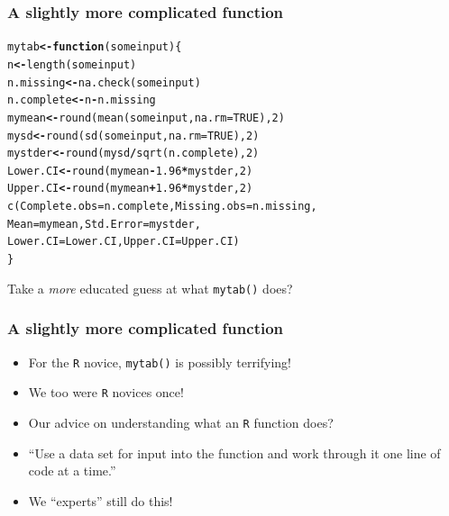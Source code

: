 \documentclass{beamer}\usepackage[]{graphicx}\usepackage[]{color}
\makeatletter
\newcommand{\hlnum}[1]{\textcolor[rgb]{0.533,0,0.133}{#1}}%
\newcommand{\hlopt}[1]{\textcolor[rgb]{0,0,0}{\textbf{#1}}}%
\newcommand{\hlstd}[1]{\textcolor[rgb]{0,0,0}{#1}}%
\newcommand{\hlkwa}[1]{\textcolor[rgb]{0.4,0.067,0.067}{\textbf{#1}}}%
\newcommand{\hlkwb}[1]{\textcolor[rgb]{0,0,0.4}{\textbf{#1}}}%
\newcommand{\hlkwc}[1]{\textcolor[rgb]{0,0,0.4}{#1}}%
\newcommand{\hlkwd}[1]{\textcolor[rgb]{0,0.267,0.4}{#1}}%
\newenvironment{kframe}{%
 \def\at@end@of@kframe{}%
 \ifinner\ifhmode%
  \def\at@end@of@kframe{\end{minipage}}%
  \begin{minipage}{\columnwidth}%
 \fi\fi%
 \def\FrameCommand##1{\hskip\@totalleftmargin \hskip-\fboxsep
 \colorbox{shadecolor}{##1}\hskip-\fboxsep
     \hskip-\linewidth \hskip-\@totalleftmargin \hskip\columnwidth}%
 \MakeFramed {\advance\hsize-\width
   \@totalleftmargin\z@ \linewidth\hsize
   \@setminipage}}%
 {\par\unskip\endMakeFramed%
 \at@end@of@kframe}
\newenvironment{knitrout}{}{} %
\makeatother
\begin{document}
\begin{frame}[fragile]
\frametitle{A slightly more complicated function}
\begin{knitrout}
\color{fgcolor}\begin{kframe}
\begin{alltt}
\hlstd{mytab} \hlkwb{<-} \hlkwa{function}\hlstd{(}\hlkwc{someinput}\hlstd{)\{}
 \hlstd{n} \hlkwb{<-} \hlkwd{length}\hlstd{(someinput)}
 \hlstd{n.missing} \hlkwb{<-} \hlkwd{na.check}\hlstd{(someinput)}
 \hlstd{n.complete} \hlkwb{<-} \hlstd{n} \hlopt{-} \hlstd{n.missing}
 \hlstd{mymean} \hlkwb{<-} \hlkwd{round}\hlstd{(}\hlkwd{mean}\hlstd{(someinput,} \hlkwc{na.rm} \hlstd{=} \hlnum{TRUE}\hlstd{),} \hlnum{2}\hlstd{)}
 \hlstd{mysd} \hlkwb{<-} \hlkwd{round}\hlstd{(}\hlkwd{sd}\hlstd{(someinput,} \hlkwc{na.rm} \hlstd{=} \hlnum{TRUE}\hlstd{),} \hlnum{2}\hlstd{)}
 \hlstd{mystder} \hlkwb{<-} \hlkwd{round}\hlstd{(mysd}\hlopt{/}\hlkwd{sqrt}\hlstd{(n.complete),} \hlnum{2}\hlstd{)}
 \hlstd{Lower.CI} \hlkwb{<-} \hlkwd{round}\hlstd{(mymean} \hlopt{-} \hlnum{1.96}\hlopt{*}\hlstd{mystder,} \hlnum{2}\hlstd{)}
 \hlstd{Upper.CI} \hlkwb{<-} \hlkwd{round}\hlstd{(mymean} \hlopt{+} \hlnum{1.96}\hlopt{*}\hlstd{mystder,} \hlnum{2}\hlstd{)}
 \hlkwd{c}\hlstd{(}\hlkwc{Complete.obs} \hlstd{= n.complete,} \hlkwc{Missing.obs} \hlstd{= n.missing,}
   \hlkwc{Mean} \hlstd{= mymean,} \hlkwc{Std.Error} \hlstd{= mystder,}
   \hlkwc{Lower.CI} \hlstd{= Lower.CI,} \hlkwc{Upper.CI} \hlstd{= Upper.CI)}
\hlstd{\}}
\end{alltt}
\end{kframe}
\end{knitrout}
Take a \emph{more} educated guess at what \texttt{mytab()} does?
\end{frame}  

\begin{frame}[fragile]
\frametitle{A slightly more complicated function}
\begin{itemize}
  \item For the \texttt{R} novice, \texttt{mytab()} is possibly terrifying!
  \item We too were \texttt{R} novices once!
  \item Our advice on understanding what an \texttt{R} function does?\\[1em]
  \item[] \begin{center}
  ``Use a data set for input into the function and work through it one line of code at a time.''\\[1em]
  \end{center}
  \item We ``experts'' still do this!
\end{itemize}  
\end{frame}  
\end{document}
